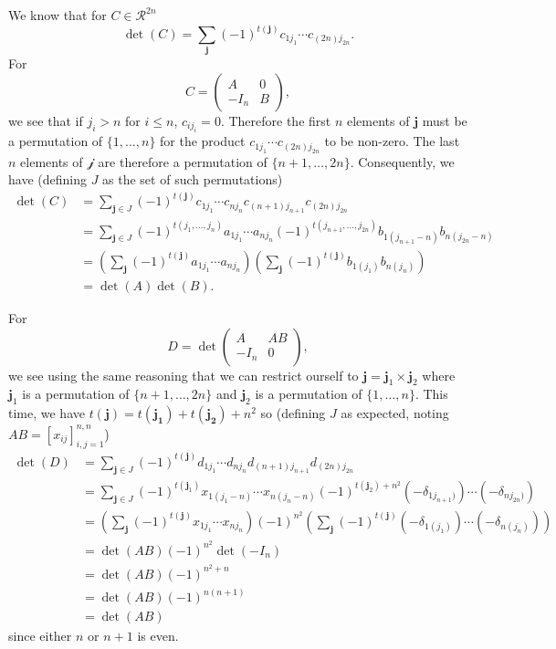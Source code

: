 \begin{solution}
  We know that for $C \in \mathcal{R}^{2n}$
  \[ \det(C) = \sum_{\mathbf{j}} (-1)^{t(\mathbf{j})} c_{1j_1} \cdots c_{(2n)j_{2n}}. \]
  For
  \[
    C = \begin{pmatrix}
      A & 0\\
      -I_n & B
    \end{pmatrix},
  \]
  we see that if $j_i > n$ for $i \leq n$, $c_{ij_i} = 0$.
  Therefore the first $n$ elements of $\mathbf{j}$ must be a permutation of $\{1, \ldots, n\}$
  for the product $c_{1j_1} \cdots c_{(2n)j_{2n}}$ to be non-zero.
  The last $n$ elements of $\mathcal{j}$ are therefore a permutation of $\{n+1, \ldots, 2n\}$.
  Consequently, we have (defining $J$ as the set of such permutations)
  \begin{align*}
    \det(C)
    & = \sum_{\mathbf{j} \in J} (-1)^{t(\mathbf{j})} c_{1j_1} \cdots c_{nj_n} c_{(n+1)j_{n+1}} c_{(2n)j_{2n}}\\
    & = \sum_{\mathbf{j} \in J} (-1)^{t(j_1, \ldots, j_n)} a_{1j_1} \cdots a_{nj_n} (-1)^{t(j_{n+1}, \ldots, j_{2n})} b_{1(j_{n+1}-n)} b_{n(j_{2n}-n)}\\
    & = \left(\sum_{\mathbf{j}} (-1)^{t(\mathbf{j})} a_{1j_1} \cdots a_{nj_n}\right)
    \left(\sum_{\mathbf{j}} (-1)^{t(\mathbf{j})} b_{1(j_1)} b_{n(j_n)}\right)\\
    & = \det(A) \det(B).
  \end{align*}

  For
  \[
    D = \det\begin{pmatrix}
      A & AB\\
      -I_n & 0
    \end{pmatrix},
  \]
  we see using the same reasoning that we can restrict ourself to
  $\mathbf{j} = \mathbf{j}_1 \times \mathbf{j}_2$
  where $\mathbf{j}_1$ is a permutation of $\{n+1, \ldots, 2n\}$
  and $\mathbf{j}_2$ is a permutation of $\{1, \ldots, n\}$.
  This time, we have $t(\mathbf{j}) = t(\mathbf{j_1}) + t(\mathbf{j_2}) + n^2$ so
  (defining $J$ as expected, noting $AB = [x_{ij}]_{i,j=1}^{n,n}$)
  \begin{align*}
    \det(D)
    & = \sum_{\mathbf{j} \in J} (-1)^{t(\mathbf{j})} d_{1j_1} \cdots d_{nj_n} d_{(n+1)j_{n+1}} d_{(2n)j_{2n}}\\
    & = \sum_{\mathbf{j} \in J} (-1)^{t(\mathbf{j}_1)} x_{1(j_1-n)} \cdots x_{n(j_n-n)} (-1)^{t(\mathbf{j}_2)+n^2} (-\delta_{1j_{n+1})}) \cdots (-\delta_{nj_{2n})})\\
    & = \left(\sum_{\mathbf{j}} (-1)^{t(\mathbf{j})} x_{1j_1} \cdots x_{nj_n}\right)
    (-1)^{n^2}\left(\sum_{\mathbf{j}} (-1)^{t(\mathbf{j})} (-\delta_{1(j_1)}) \cdots (-\delta_{n(j_n)})\right)\\
    & = \det(AB) (-1)^{n^2}\det(-I_n)\\
    & = \det(AB) (-1)^{n^2+n}\\
    & = \det(AB) (-1)^{n(n+1)}\\
    & = \det(AB)
  \end{align*}
  since either $n$ or $n+1$ is even.
\end{solution}

